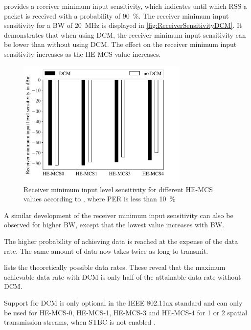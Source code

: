 \cite{ieee_standard_2021ax} provides a receiver minimum input sensitivity, which indicates until which \ac{RSS} a packet is
received with a probability of \SI{90}{\percent}.
The receiver minimum input sensitivity for a \ac{BW} of
\SI{20}{\mega\hertz} is displayed in \autoref{fig:ReceiverSensitivityDCM}.
It demonstrates that when using \ac{DCM},
the receiver minimum input sensitivity can be lower than without using \ac{DCM}. The effect on the receiver minimum
input sensitivity increases as the \ac{HE}-\ac{MCS} value increases.
\begin{figure}%
	\centering
	\includegraphics[width=0.75\textwidth]{figures/Receiver_minimum_DCM}
	\caption{Receiver minimum input level sensitivity for different \ac{HE}-\ac{MCS} values according to \cite{ieee_standard_2021ax}, where \ac{PER} is less than \SI{10}{\percent}}%
	\label{fig:ReceiverSensitivityDCM}%
\end{figure}

A similar development of the receiver minimum input sensitivity can also be observed for higher \ac{BW}, except
that the lowest value increases with \ac{BW}.

The higher probability of achieving data is reached at the expense of the data rate.
The same amount of data now takes twice as long to transmit.

\cite{ieee_standard_2021ax} lists the theoretically possible data rates.
These reveal that the maximum achievable data rate with \ac{DCM} is only half of the attainable data rate without DCM.

Support for \ac{DCM} is only optional in the IEEE 802.11ax standard and can only be used for \ac{HE}-\ac{MCS}-\num{0},
\ac{HE}-\ac{MCS}-\num{1}, \ac{HE}-\ac{MCS}-\num{3} and \ac{HE}-\ac{MCS}-\num{4} for \num{1} or \num{2} spatial
transmission streams, when \ac{STBC} is not enabled \cite{ieee_standard_2021ax}.

